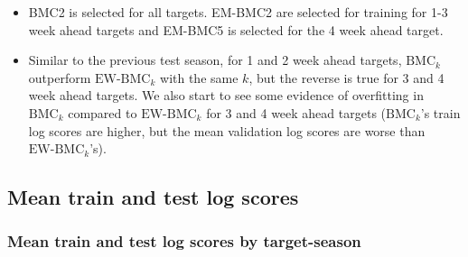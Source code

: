 \documentclass[
]{article}
\begin{document}
\begin{itemize}
\item BMC2 is selected for all targets. EM-BMC2 are selected for training for 1-3 week ahead targets and EM-BMC5 is selected for the 4 week ahead target.
\item Similar to the previous test season, for 1 and 2 week ahead targets, $\text{BMC}_k$ outperform $\text{EW-BMC}_k$ with the same $k$, but the reverse is true for 3 and 4 week ahead targets. We also start to see some evidence of overfitting in $\text{BMC}_k$ compared to $\text{EW-BMC}_k$ for 3 and 4 week ahead targets ($\text{BMC}_k$'s train log scores are higher, but the mean validation log scores are worse than $\text{EW-BMC}_k$'s).
\end{itemize}

\newpage

\hypertarget{mean-train-and-test-log-scores}{%
\subsection{Mean train and test log
scores}\label{mean-train-and-test-log-scores}}

\hypertarget{mean-train-and-test-log-scores-by-target-season}{%
\subsubsection{Mean train and test log scores by
target-season}\label{mean-train-and-test-log-scores-by-target-season}}
\end{document}
